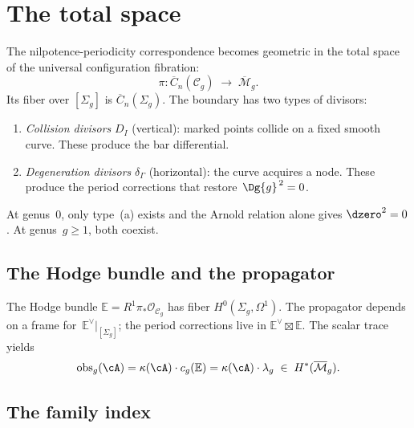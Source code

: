 \section{The total space}
\label{sec:modular-homotopy-theory}

The nilpotence-periodicity correspondence becomes geometric in the
total space of the universal configuration fibration:
\begin{equation}\label{eq:total-fibration-intro}
\pi \colon \overline{C}_n(\mathcal{C}_g) \;\longrightarrow\;
\overline{\mathcal{M}}_g.
\end{equation}
Its fiber over $[\Sigma_g]$ is $\overline{C}_n(\Sigma_g)$.  The
boundary has two types of divisors:
\begin{enumerate}[label=\textup{(\alph*)}]
\item \emph{Collision divisors} $D_I$ (vertical): marked points
  collide on a fixed smooth curve.  These produce the bar
  differential.
\item \emph{Degeneration divisors} $\delta_\Gamma$ (horizontal):
  the curve acquires a node.  These produce the period corrections
  that restore~$\Dg{g}^{\,2} = 0$.
\end{enumerate}
At genus~$0$, only type~(a) exists and the Arnold relation alone
gives $\dzero^2 = 0$.  At genus~$g \geq 1$, both coexist.

\subsection{The Hodge bundle and the propagator}
\label{subsec:hodge-deformation-engine}

The Hodge bundle $\mathbb{E} = R^1\pi_*\mathcal{O}_{\mathcal{C}_g}$
has fiber $H^0(\Sigma_g, \Omega^1)$.  The propagator depends on a
frame for~$\mathbb{E}^\vee|_{[\Sigma_g]}$; the period corrections
live in $\mathbb{E}^\vee \boxtimes \mathbb{E}$.  The scalar trace
yields
\begin{equation}\label{eq:lambda-from-trace}
\mathrm{obs}_g(\cA)
= \kappa(\cA) \cdot c_g(\mathbb{E})
= \kappa(\cA) \cdot \lambda_g
\;\in\; H^*(\overline{\mathcal{M}}_g).
\end{equation}

\subsection{The family index}
\label{subsec:family-index-intro}

